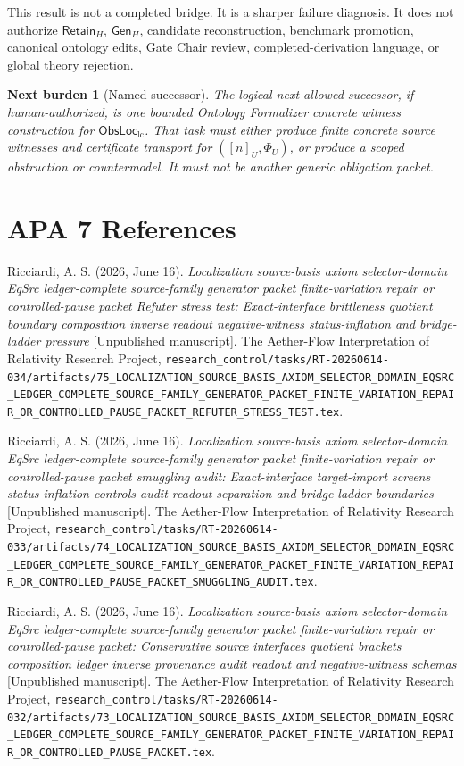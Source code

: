 \documentclass[11pt]{article}
\newcommand{\ObsLocLC}{\mathsf{ObsLoc}_{\mathrm{lc}}}
\newcommand{\RetainH}{\mathsf{Retain}_{H}}
\newcommand{\GenH}{\mathsf{Gen}_{H}}
\newtheorem{nextburden}{Next burden}
\begin{document}
This result is not a completed bridge. It is a sharper failure
diagnosis. It does not authorize \(\RetainH\), \(\GenH\), candidate
reconstruction, benchmark promotion, canonical ontology edits, Gate
Chair review, completed-derivation language, or global theory
rejection.

\begin{nextburden}[Named successor]
The logical next allowed successor, if human-authorized, is one
bounded Ontology Formalizer concrete witness construction for
\(\ObsLocLC\). That task must either produce finite concrete source
witnesses and certificate transport for \(([n]_U,\Phi_U)\), or produce
a scoped obstruction or countermodel. It must not be another generic
obligation packet.
\end{nextburden}

\section*{APA 7 References}

Ricciardi, A. S. (2026, June 16). \emph{Localization source-basis axiom
selector-domain EqSrc ledger-complete source-family generator packet
finite-variation repair or controlled-pause packet Refuter stress
test: Exact-interface brittleness quotient boundary composition
inverse readout negative-witness status-inflation and bridge-ladder
pressure} [Unpublished manuscript]. The Aether-Flow Interpretation of
Relativity Research Project,
\texttt{research\_control/tasks/RT-20260614-034/artifacts/75\_LOCALIZATION\_SOURCE\_BASIS\_AXIOM\_SELECTOR\_DOMAIN\_EQSRC\_LEDGER\_COMPLETE\_SOURCE\_FAMILY\_GENERATOR\_PACKET\_FINITE\_VARIATION\_REPAIR\_OR\_CONTROLLED\_PAUSE\_PACKET\_REFUTER\_STRESS\_TEST.tex}.

Ricciardi, A. S. (2026, June 16). \emph{Localization source-basis axiom
selector-domain EqSrc ledger-complete source-family generator packet
finite-variation repair or controlled-pause packet smuggling audit:
Exact-interface target-import screens status-inflation controls
audit-readout separation and bridge-ladder boundaries} [Unpublished
manuscript]. The Aether-Flow Interpretation of Relativity Research
Project,
\texttt{research\_control/tasks/RT-20260614-033/artifacts/74\_LOCALIZATION\_SOURCE\_BASIS\_AXIOM\_SELECTOR\_DOMAIN\_EQSRC\_LEDGER\_COMPLETE\_SOURCE\_FAMILY\_GENERATOR\_PACKET\_FINITE\_VARIATION\_REPAIR\_OR\_CONTROLLED\_PAUSE\_PACKET\_SMUGGLING\_AUDIT.tex}.

Ricciardi, A. S. (2026, June 16). \emph{Localization source-basis axiom
selector-domain EqSrc ledger-complete source-family generator packet
finite-variation repair or controlled-pause packet: Conservative
source interfaces quotient brackets composition ledger inverse
provenance audit readout and negative-witness schemas} [Unpublished
manuscript]. The Aether-Flow Interpretation of Relativity Research
Project,
\texttt{research\_control/tasks/RT-20260614-032/artifacts/73\_LOCALIZATION\_SOURCE\_BASIS\_AXIOM\_SELECTOR\_DOMAIN\_EQSRC\_LEDGER\_COMPLETE\_SOURCE\_FAMILY\_GENERATOR\_PACKET\_FINITE\_VARIATION\_REPAIR\_OR\_CONTROLLED\_PAUSE\_PACKET.tex}.
\end{document}

